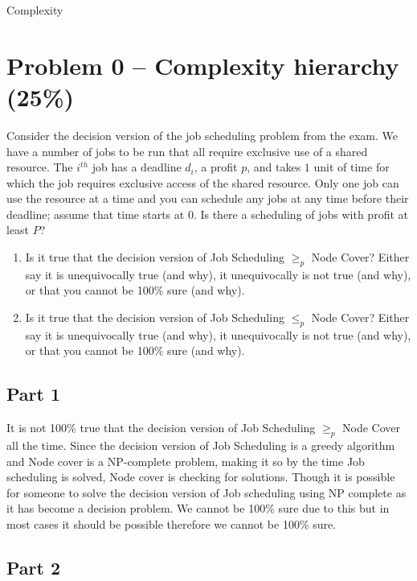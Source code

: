 \documentclass[12pt,letterpaper]{article}
\begin{document}
\begin{center}
    \LARGE Complexity
\end{center}

\section*{Problem 0 -- Complexity hierarchy (25\%)}
Consider the decision version of the job scheduling problem from the exam.
We have a number of jobs to be run that all require exclusive use of a shared resource.
The $i^{th}$ job has a deadline $d_i$, a profit $p$, and takes $1$ unit of time for which the job requires exclusive access of the shared resource.
Only one job can use the resource at a time and you can schedule any jobs at any time before their deadline; assume that time starts at $0$.
Is there a scheduling of jobs with profit at least $P$?

\begin{enumerate}
    \item Is it true that the decision version of Job Scheduling $\geq_p$ Node Cover? Either say it is unequivocally true (and why), it unequivocally is not true (and why), or that you cannot be 100\% sure (and why).
    \item Is it true that the decision version of Job Scheduling $\leq_p$ Node Cover? Either say it is unequivocally true (and why), it unequivocally is not true (and why), or that you cannot be 100\% sure (and why).
\end{enumerate}

\subsection{Part 1}

It is not 100\% true that the decision version of Job Scheduling $\geq_p$ Node Cover all the time. Since the decision version of Job Scheduling is a greedy algorithm and Node cover is a NP-complete problem,
making it so by the time Job scheduling is solved, Node cover is checking for solutions. Though it is possible for someone to solve the decision version of Job scheduling using NP complete as it has become a decision problem. We cannot be 100\% sure due to this but in most cases it should be possible therefore we cannot be 100\% sure.

\subsection{Part 2}
\end{document}
